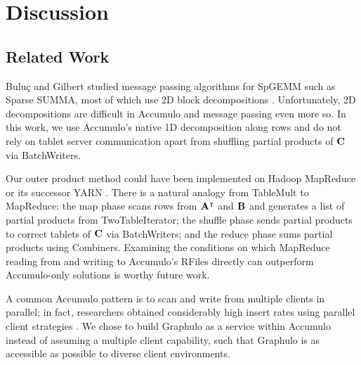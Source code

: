 
\section{Discussion}
\label{sDiscussion}

\subsection{Related Work} %
Bulu\c{c} and Gilbert studied message passing algorithms for SpGEMM
such as Sparse SUMMA, most of which use 2D block decompositions \cite{buluc2012parallel}.
Unfortunately, 2D decompositions are difficult in Accumulo 
and message passing even more so.
In this work, we use Accumulo's native 1D decomposition along rows 
and do not rely on tablet server communication
apart from shuffling partial products of $\mathbf{C}$ via BatchWriters.


Our outer product method could have been implemented on Hadoop MapReduce %
 or its successor YARN \cite{vavilapalli2013apache}.
There is a natural analogy from TableMult to MapReduce:
the map phase scans rows from $\mathbf{A^{\intercal}}$ and $\mathbf{B}$
and generates a list of partial products from TwoTableIterator;
the shuffle phase sends partial products to correct tablets of $\mathbf{C}$ via BatchWriters;
and the reduce phase sums partial products using Combiners.
Examining the conditions on which MapReduce 
reading from and writing to Accumulo's RFiles directly
can outperform Accumulo-only solutions
is worthy future work.


A common Accumulo pattern is to 
scan and write from multiple clients in parallel;
in fact, researchers obtained 
considerably high insert rates using parallel client strategies \cite{kepner2014achieving}.
We chose to build Graphulo as a service within Accumulo
instead of assuming a multiple client capability,
such that Graphulo is as accessible as possible to diverse client environments.

